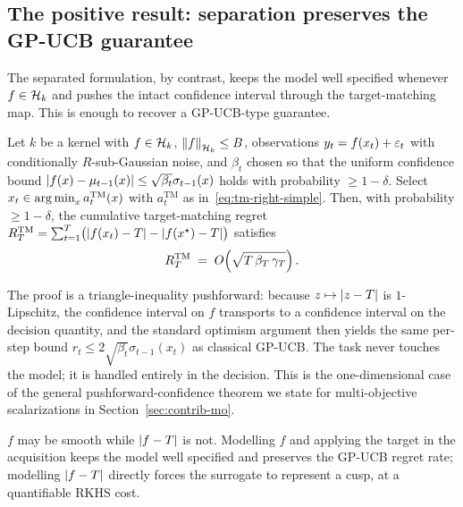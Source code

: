 \subsection{The positive result: separation preserves the GP-UCB guarantee}
\label{sec:contrib-tm-pos}

The separated formulation, by contrast, keeps the model well specified whenever
$f\in\mathcal{H}_k$ and pushes the intact confidence interval through the target-matching
map. This is enough to recover a GP-UCB-type guarantee.

\begin{theorem}
\label{thm:tm-soc}
Let $k$ be a kernel with $f\in\mathcal{H}_k$, $\left\lVert f\right\rVert_{\mathcal{H}_k}\le B$, observations
$y_t=f(x_t)+\varepsilon_t$ with conditionally $R$-sub-Gaussian noise, and $\beta_t$
chosen so that the uniform confidence bound
$\left\lvert f(x)-\mu_{t-1}(x)\right\rvert\le\sqrt{\beta_t}\sigma_{t-1}(x)$ holds with probability
$\ge 1-\delta$. Select $x_t\in\operatorname*{arg\,min}_x a_t^{\mathrm{TM}}(x)$ with $a_t^{\mathrm{TM}}$
as in~\eqref{eq:tm-right-simple}. Then, with probability $\ge 1-\delta$, the
cumulative target-matching regret
$R_T^{\mathrm{TM}}=\sum_{t=1}^T\bigl(\left\lvert f(x_t)-T\right\rvert-\left\lvert f(x^\star)-T\right\rvert\bigr)$
satisfies
\begin{equation}
  R_T^{\mathrm{TM}} \;=\; O\!\left(\sqrt{T\,\beta_T\,\gamma_T}\right).
  \label{eq:tm-soc}
\end{equation}
\end{theorem}

The proof is a triangle-inequality pushforward: because $z\mapsto\left\lvert z-T\right\rvert$ is
$1$-Lipschitz, the confidence interval on $f$ transports to a confidence interval
on the decision quantity, and the standard optimism argument then yields the same
per-step bound $r_t\le 2\sqrt{\beta_t}\sigma_{t-1}(x_t)$ as classical GP-UCB. The
task never touches the model; it is handled entirely in the decision. This is the
one-dimensional case of the general pushforward-confidence theorem we state for
multi-objective scalarizations in Section~\ref{sec:contrib-mo}.

\begin{takeaway}
$f$ may be smooth while $\left\lvert f-T\right\rvert$ is not. Modelling $f$ and applying the target
in the acquisition keeps the model well specified and preserves the GP-UCB regret
rate; modelling $\left\lvert f-T\right\rvert$ directly forces the surrogate to represent a cusp,
at a quantifiable RKHS cost.
\end{takeaway}



